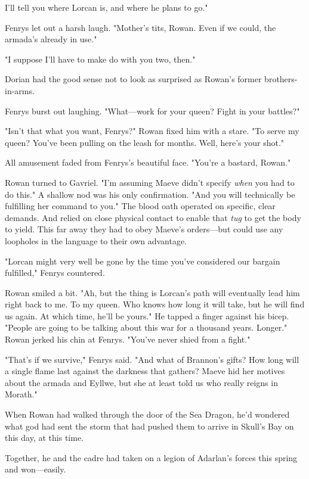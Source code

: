 I'll tell you where Lorcan is, and where he plans to go."

Fenrys let out a harsh laugh. "Mother's tits, Rowan. Even if we could, the armada's already in use."

"I suppose I'll have to make do with you two, then."

Dorian had the good sense not to look as surprised as Rowan's former brothers-in-arms.

Fenrys burst out laughing. "What---work for your queen? Fight in your battles?"

"Isn't that what you want, Fenrys?" Rowan fixed him with a stare. "To serve my queen? You've been pulling on the leash for months. Well, here's your shot."

All amusement faded from Fenrys's beautiful face. "You're a bastard, Rowan."

Rowan turned to Gavriel. "I'm assuming Maeve didn't specify \emph{when}
you had to do this." A shallow nod was his only confirmation. "And you will technically be fulfilling her command to you." The blood oath operated on specific, clear demands. And relied on close physical contact to enable that \emph{tug} to get the body to yield. This far away  they had to obey Maeve's orders---but could use any loopholes in the language to their own advantage.

"Lorcan might very well be gone by the time you've considered our bargain fulfilled," Fenrys countered.

Rowan smiled a bit. "Ah, but the thing is  Lorcan's path will eventually lead him right back to me. To my queen. Who knows how long it will take, but he will find us again. At which time, he'll be yours." He tapped a finger against his bicep. "People are going to be talking about this war for a thousand years. Longer." Rowan jerked his chin at Fenrys. "You've never shied from a fight."

"That's if we survive," Fenrys said. "And what of Brannon's gifts? How long will a single flame last against the darkness that gathers? Maeve hid her motives about the armada and Eyllwe, but she at least told us who really reigns in Morath."

When Rowan had walked through the door of the Sea Dragon, he'd wondered what god had sent the storm that had pushed them to arrive in Skull's Bay on this day, at this time.

Together, he and the cadre had taken on a legion of Adarlan's forces this spring and won---easily.

